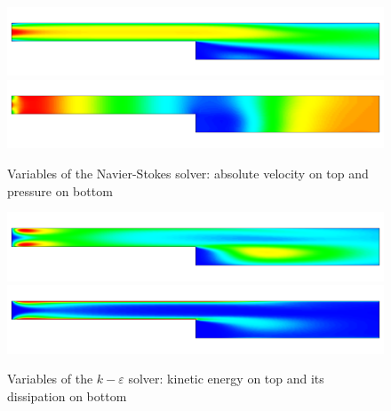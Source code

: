 \begin{figure}[h]
\centering
\includegraphics[width=15cm]{step_ke_velo}
\includegraphics[width=15cm]{step_ke_pres}
\caption{Variables of the Navier-Stokes solver: absolute velocity on top and 
pressure on bottom}\label{fg:step_ns}
\end{figure} 

\begin{figure}[h]
\centering
\includegraphics[width=15cm]{step_ke_kin}
\includegraphics[width=15cm]{step_ke_diss}
\caption{Variables of the $k-\varepsilon$ solver: kinetic energy on top and its dissipation on bottom}
\label{fg:step_ke}
\end{figure} 


\hfill
